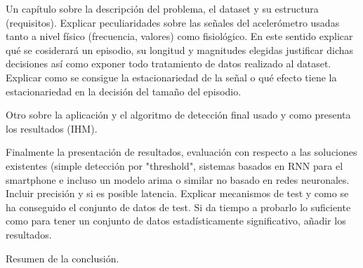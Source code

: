 \documentclass[../tfm.tex]{subfiles}
\begin{document}
Un capítulo sobre la descripción del problema, el dataset y su estructura (requisitos). Explicar peculiaridades sobre las señales del acelerómetro usadas tanto a nivel físico (frecuencia, valores) como fisiológico. En este sentido explicar qué se cosiderará un episodio, su longitud y magnitudes elegidas justificar dichas decisiones así como exponer todo tratamiento de datos realizado al dataset. Explicar como se consigue la estacionariedad de la señal o qué efecto tiene la estacionariedad en la decisión del tamaño del episodio.

Otro sobre la aplicación y el algoritmo de detección final usado y como presenta los resultados (IHM).

Finalmente la presentación de resultados, evaluación con respecto a las soluciones existentes (simple detección por "threshold", sistemas basados en RNN para el smartphone e incluso un modelo arima o similar no basado en redes neuronales. Incluir precisión y si es posible latencia. Explicar mecanismos de test y como se ha conseguido el conjunto de datos de test. Si da tiempo a probarlo lo suficiente como para tener un conjunto de datos estadísticamente significativo, añadir los resultados.

Resumen de la conclusión.
\end{document}
